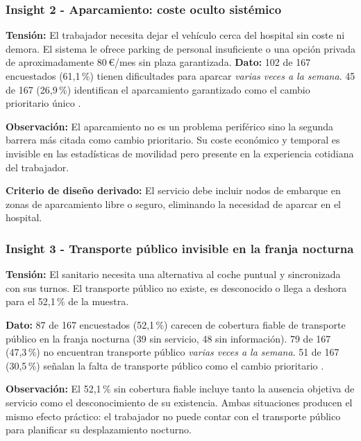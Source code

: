 \subsubsection{Insight 2 - Aparcamiento: coste oculto sistémico}
\label{sec:insight-2}

\textbf{Tensión:} El trabajador necesita dejar el vehículo cerca
del hospital sin coste ni demora. El sistema le ofrece parking
de personal insuficiente o una opción privada de aproximadamente
80\,€/mes sin plaza garantizada.
\textbf{Dato:} 102 de 167 encuestados (61{,}1\,\%) tienen
dificultades para aparcar \emph{varias veces a la semana}.
45 de 167 (26{,}9\,\%) identifican el aparcamiento garantizado
como el cambio prioritario único \parencite{LouridoRegueira2026}.

\textbf{Observación:} El aparcamiento no es un problema periférico sino la segunda barrera más citada como cambio prioritario. Su coste económico y temporal es invisible en las estadísticas de movilidad pero presente en la experiencia cotidiana del trabajador.

\textbf{Criterio de diseño derivado:} El servicio debe incluir
nodos de embarque en zonas de aparcamiento libre o seguro,
eliminando la necesidad de aparcar en el hospital.


\subsubsection{Insight 3 - Transporte público invisible en la franja nocturna}
\label{sec:insight-3}

\textbf{Tensión:} El sanitario necesita una alternativa al coche
puntual y sincronizada con sus turnos. El transporte público no
existe, es desconocido o llega a deshora para el 52{,}1\,\%
de la muestra.

\textbf{Dato:} 87 de 167 encuestados (52{,}1\,\%) carecen de
cobertura fiable de transporte público en la franja nocturna
(39 sin servicio, 48 sin información). 79 de 167 (47{,}3\,\%)
no encuentran transporte público \emph{varias veces a la semana}.
51 de 167 (30{,}5\,\%) señalan la falta de transporte público
como el cambio prioritario \parencite{LouridoRegueira2026}.

\textbf{Observación:} El 52{,}1\,\% sin cobertura fiable incluye tanto la ausencia objetiva de servicio como el desconocimiento de su existencia. Ambas situaciones producen el mismo efecto práctico: el trabajador no puede contar con el transporte público para planificar su desplazamiento nocturno.

